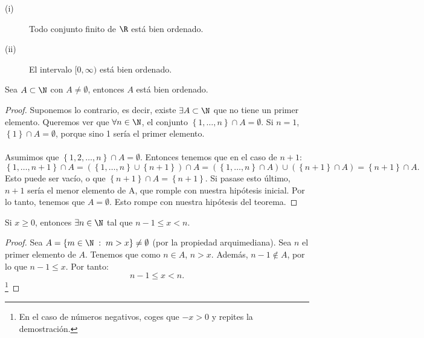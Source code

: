 \begin{eg}
\normalfont 
\begin{description}
\item[(i)] Todo conjunto finito de $\displaystyle \R $ está bien ordenado.
\item[(ii)] El intervalo $\displaystyle [0, \infty) $ está bien ordenado. 
\end{description}
\end{eg}

\begin{ftheorem}[]
\normalfont Sea $\displaystyle A \subset \N $ con $\displaystyle A \neq\emptyset $, entonces $\displaystyle A $ está bien ordenado.
\end{ftheorem}

\begin{proof}
	Suponemos lo contrario, es decir, existe $\displaystyle \exists A \subset \N $ que no tiene un primer elemento. Queremos ver que $\displaystyle \forall n \in \N $, el conjunto $\displaystyle \left\{ 1, \ldots, n\right\} \cap A = \emptyset $. Si $\displaystyle n = 1 $, $\displaystyle \left\{ 1\right\} \cap A = \emptyset $, porque sino 1 sería el primer elemento. \\ \\
	Asumimos que $\displaystyle \left\{ 1, 2, \ldots, n\right\} \cap A = \emptyset $. Entonces tenemos que en el caso de $\displaystyle n + 1 $:
	\[ \left\{ 1, \ldots, n+1\right\} \cap A = \left( \left\{ 1, \ldots, n\right\} \cup \left\{ n+ 1\right\} \right) \cap A = \left( \left\{ 1, \ldots, n\right\} \cap A\right) \cup \left( \left\{ n+1\right\} \cap A\right) = \left\{ n+1\right\} \cap A .\]
	Esto puede ser vacío, o que $\displaystyle \left\{ n+1\right\} \cap A = \left\{ n+1\right\}  $. Si pasase esto último, $\displaystyle n + 1 $ sería el menor elemento de A, que romple con nuestra hipótesis inicial. Por lo tanto, tenemos que $\displaystyle A = \emptyset $. Esto rompe con nuestra hipótesis del teorema.
\end{proof}

\begin{fcolorary}[]
\normalfont Si $\displaystyle x \geq 0 $, entonces $\displaystyle \exists n \in \N $ tal que $\displaystyle n-1\leq x < n $.
\end{fcolorary}

\begin{proof}
	Sea $\displaystyle A = \left\{ m \in \N\; : \; m > x\right\} \neq \emptyset $ (por la propiedad arquimediana). Sea $\displaystyle n $ el primer elemento de $\displaystyle A $. Tenemos que como $\displaystyle n \in A $, $\displaystyle n > x $. Además, $\displaystyle n-1 \not\in A $, por lo que $\displaystyle n-1 \leq x $. Por tanto:
	\[n-1\leq x < n .\]
\footnote{En el caso de números negativos, coges que $\displaystyle - x > 0 $ y repites la demostración.} 
\end{proof}

